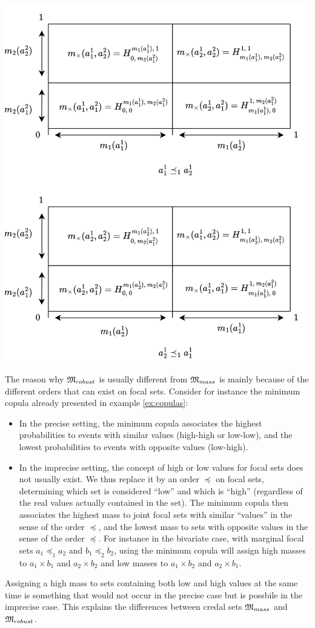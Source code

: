 \begin{example}
    \begin{center}
    \includegraphics[width=0.8\linewidth]{Images/M_mass_h_volume.png}\label{fig:joint_distrib_arb}
    \end{center}
\end{example}

\begin{remark}
    The reason why ${\mathfrak{M}}_{robust}$ is usually different from ${\mathfrak{M}}_{mass}$ is mainly because of the different orders that can exist on focal sets. Consider for instance the minimum copula already presented in example \ref{ex:copulas}:
    \begin{itemize}
        \item In the precise setting, the minimum copula associates the highest probabilities to events with similar values (high-high or low-low), and the lowest probabilities to events with opposite values (low-high).
        \item In the imprecise setting, the concept of high or low values for focal sets does not usually exist. We thus replace it by an order $\preceq$ on focal sets, determining which set is considered ``low'' and which is ``high'' (regardless of the real values actually contained in the set). The minimum copula then associates the highest mass to joint focal sets with similar ``values'' in the sense of the order $\preceq$, and the lowest mass to sets with opposite values in the sense of the order $\preceq$. For instance in the bivariate case, with marginal focal sets $a_1\preceq_1 a_2$ and $b_1\preceq_2 b_2$, using the minimum copula will assign high masses to $a_1\times b_1$ and $a_2\times b_2$ and low masses to $a_1\times b_2$ and $a_2\times b_1$.
    \end{itemize}
    Assigning a high mass to sets containing both low and high values at the same time is something that would not occur in the precise case but is possbile in the imprecise case. This explains the differences between credal sets ${\mathfrak{M}}_{mass}$ and ${\mathfrak{M}}_{robust}$. 
\end{remark}

